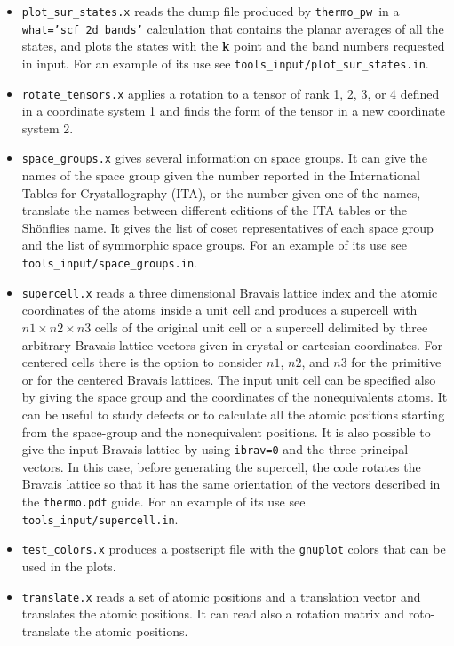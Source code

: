\documentclass[12pt,a4paper]{article}
\def\thermo{\texttt{thermo\_pw}}
\begin{document}
\begin{itemize}
\item \texttt{plot\_sur\_states.x} reads the dump file produced
by \thermo\ in a \texttt{what='scf\_2d\_bands'} calculation that
contains the planar averages of all the states, and plots
the states with the {\bf k} point and the band numbers requested in input.
For an example of its use see \texttt{tools\_input/plot\_sur\_states.in}.

\item \texttt{rotate\_tensors.x} applies a rotation to a tensor
of rank 1, 2, 3, or 4 defined in a coordinate system 1 and finds the form
of the tensor in a new coordinate system 2. 

\item \texttt{space\_groups.x} gives several information on space groups.
It can give the names of the space group given the number reported in
the International Tables for Crystallography (ITA), or
the number given one of the names, translate the names between different
editions of the ITA tables or the Sh\"onflies name. It gives the list 
of coset representatives of each space group and the list of symmorphic 
space groups.
For an example of its use see \texttt{tools\_input/space\_groups.in}.

\item \texttt{supercell.x} reads a three dimensional
Bravais lattice index and the atomic coordinates of the atoms inside a unit
cell and produces a supercell with $n1 \times n2 \times n3$ cells of 
the original
unit cell or a supercell delimited by three arbitrary Bravais lattice
vectors given in crystal or cartesian coordinates. For centered cells 
there is the option to consider $n1$, $n2$,
and $n3$ for the primitive or for the centered Bravais lattices.
The input unit cell can be specified also by giving the space group and
the coordinates of the nonequivalents atoms.
It can be useful to study defects or to calculate all the 
atomic positions starting from the space-group and the 
nonequivalent positions.
It is also possible to give the input Bravais lattice by using
\texttt{ibrav=0} and the three principal vectors. In this case,
before generating the supercell, the code rotates the Bravais
lattice so that it has the same orientation of the vectors described
in the \texttt{thermo.pdf} guide.
For an example of its use see \texttt{tools\_input/supercell.in}.

\item \texttt{test\_colors.x} produces a postscript file with the 
\texttt{gnuplot} colors that can be used in the plots.   

\item \texttt{translate.x} reads a set of atomic positions and a translation
vector and translates the atomic positions. It can read also a rotation matrix 
and roto-translate the atomic positions.

\end{itemize}
\end{document}
